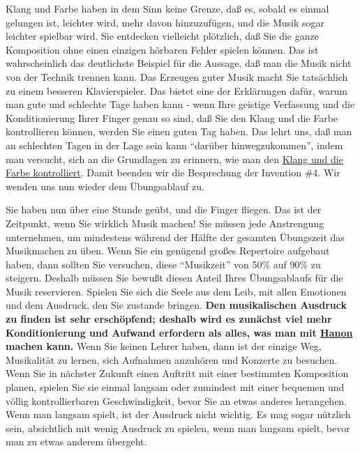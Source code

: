 Klang und Farbe haben in dem Sinn keine Grenze, daß es, sobald es einmal gelungen ist, leichter wird, mehr davon hinzuzufügen, und die Musik sogar leichter spielbar wird.
Sie entdecken vielleicht plötzlich, daß Sie die ganze Komposition ohne einen einzigen hörbaren Fehler spielen können.
Das ist wahrscheinlich das deutlichste Beispiel für die Aussage, daß man die Musik nicht von der Technik trennen kann.
Das Erzeugen guter Musik macht Sie tatsächlich zu einem besseren Klavierspieler.
Das bietet eine der Erklärungen dafür, warum man gute und schlechte Tage haben kann - wenn Ihre geistige Verfassung und die Konditionierung Ihrer Finger genau so sind, daß Sie den Klang und die Farbe kontrollieren können, werden Sie einen guten Tag haben.
Das lehrt uns, daß man an schlechten Tagen in der Lage sein kann \enquote{darüber hinwegzukommen}, indem man versucht, sich an die Grundlagen zu erinnern, wie man den \hyperlink{c1iii1}{Klang und die Farbe kontrolliert}.
Damit beenden wir die Besprechung der Invention \#4.
Wir wenden uns nun wieder dem Übungsablauf zu.

Sie haben nun über eine Stunde geübt, und die Finger fliegen.
Das ist der Zeitpunkt, wenn Sie wirklich Musik machen!
Sie müssen jede Anstrengung unternehmen, um mindestens während der Hälfte der gesamten Übungszeit das Musikmachen zu üben.
Wenn Sie ein genügend großes Repertoire aufgebaut haben, dann sollten Sie versuchen, diese \enquote{Musikzeit} von 50\% auf 90\% zu steigern.
Deshalb müssen Sie bewußt diesen Anteil Ihres Übungsablaufs für die Musik reservieren.
Spielen Sie sich die Seele aus dem Leib, mit allen Emotionen und dem Ausdruck, den Sie zustande bringen.
\textbf{Den musikalischen Ausdruck zu finden ist sehr erschöpfend; deshalb wird es zunächst viel mehr Konditionierung und Aufwand erfordern als alles, was man mit \hyperlink{c1iii7h}{Hanon} machen kann.}
Wenn Sie keinen Lehrer haben, dann ist der einzige Weg, Musikalität zu lernen, sich Aufnahmen anzuhören und Konzerte zu besuchen.
Wenn Sie in nächster Zukunft einen Auftritt mit einer bestimmten Komposition planen, spielen Sie sie einmal langsam oder zumindest mit einer bequemen und völlig kontrollierbaren Geschwindigkeit, bevor Sie an etwas anderes herangehen.
Wenn man langsam spielt, ist der Ausdruck nicht wichtig.
Es mag sogar nützlich sein, absichtlich mit wenig Ausdruck zu spielen, wenn man langsam spielt, bevor man zu etwas anderem übergeht.

